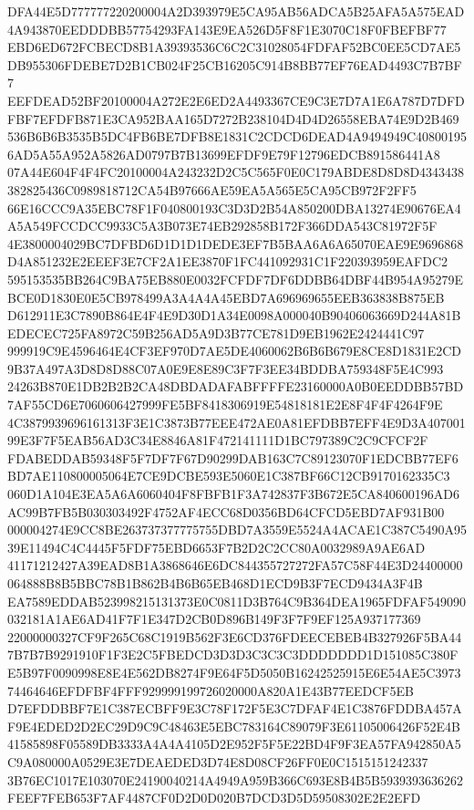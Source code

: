 \documentclass[UTF8,fontset=fandol,zihao=-4,a4paper]{ctexart}
\begin{document}
{{DFA44E5D777777220200004A2D393979E5CA95AB56ADCA5B25AFA5A575EAD4A943870EEDDDBB57754293FA143E9EA526D5F8F1E3070C18F0FBEFBF77
EBD6ED672FCBECD8B1A39393536C6C2C31028054FDFAF52BC0EE5CD7AE5DB955306FDEBE7D2B1CB024F25CB16205C914B8BB77EF76EAD4493C7B7BF7
EEFDEAD52BF20100004A272E2E6ED2A4493367CE9C3E7D7A1E6A787D7DFDFBF7EFDFB871E3CA952BAA165D7272B238104D4D4D26558EBA74E9D2B469
536B6B6B3535B5DC4FB6BE7DFB8E1831C2CDCD6DEAD4A9494949C408001956AD5A55A952A5826AD0797B7B13699EFDF9E79F12796EDCB891586441A8
07A44E604F4F4FC20100004A243232D2C5C565F0E0C179ABDE8D8D8D4343438382825436C0989818712CA54B97666AE59EA5A565E5CA95CB972F2FF5
66E16CCC9A35EBC78F1F040800193C3D3D2B54A850200DBA13274E90676EA4A5A549FCCDCC9933C5A3B073E74EB292858B172F366DDA543C81972F5F
4E3800004029BC7DFBD6D1D1D1DEDE3EF7B5BAA6A6A65070EAE9E9696868D4A851232E2EEEF3E7CF2A1EE3870F1FC441092931C1F220393959EAFDC2
595153535BB264C9BA75EB880E0032FCFDF7DF6DDBB64DBF44B954A95279EBCE0D1830E0E5CB978499A3A4A4A45EBD7A696969655EEB363838B875EB
D612911E3C7890B864E4F4E9D30D1A34E0098A000040B90406063669D244A81BEDECEC725FA8972C59B256AD5A9D3B77CE781D9EB1962E2424441C97
999919C9E4596464E4CF3EF970D7AE5DE4060062B6B6B679E8CE8D1831E2CD9B37A497A3D8D8D88C07A0E9E8E89C3F7F3EE34BDDBA759348F5E4C993
24263B870E1DB2B2B2CA48DBDADAFABFFFFE23160000A0B0EEDDBB57BD7AF55CD6E7060606427999FE5BF8418306919E54818181E2E8F4F4F4264F9E
4C3879939696161313F3E1C3873B77EEE472AE0A81EFDBB7EFF4E9D3A40700199E3F7F5EAB56AD3C34E8846A81F472141111D1BC797389C2C9CFCF2F
FDABEDDAB59348F5F7DF7F67D90299DAB163C7C89123070F1EDCBB77EF6BD7AE110800005064E7CE9DCBE593E5060E1C387BF66C12CB9170162335C3
060D1A104E3EA5A6A6060404F8FBFB1F3A742837F3B672E5CA840600196AD6AC99B7FB5B030303492F4752AF4ECC68D0356BD64CFCD5EBD7AF931B00
000004274E9CC8BE263737377775755DBD7A3559E5524A4ACAE1C387C5490A9539E11494C4C4445F5FDF75EBD6653F7B2D2C2CC80A0032989A9AE6AD
41171212427A39EAD8B1A3868646E6DC844355727272FA57C58F44E3D24400000064888B8B5BBC78B1B862B4B6B65EB468D1ECD9B3F7ECD9434A3F4B
EA7589EDDAB523998215131373E0C0811D3B764C9B364DEA1965FDFAF549090032181A1AE6AD41F7F1E347D2CB0D896B149F3F7F9EF125A937177369
22000000327CF9F265C68C1919B562F3E6CD376FDEECEBEB4B327926F5BA447B7B7B9291910F1F3E2C5FBEDCD3D3D3C3C3C3DDDDDDD1D151085C380F
E5B97F0090998E8E4E562DB8274F9E64F5D5050B16242525915E6E54AE5C397374464646EFDFBF4FFF929999199726020000A820A1E43B77EEDCF5EB
D7EFDDBBF7E1C387ECBFF9E3C78F172F5E3C7DFAF4E1C3876FDDBA457AF9E4EDED2D2EC29D9C9C48463E5EBC783164C89079F3E61105006426F52E4B
41585898F05589DB3333A4A4A4105D2E952F5F5E22BD4F9F3EA57FA942850A5C9A080000A0529E3E7DEAEDED3D74E8D08CF26FF0E0C1515151242337
3B76EC1017E103070E24190040214A4949A959B366C693E8B4B5B5939393636262FEEF7FEB653F7AF4487CF0D2D0D020B7DCD3D5D59508302E2E2EFD
}}
\end{document}
